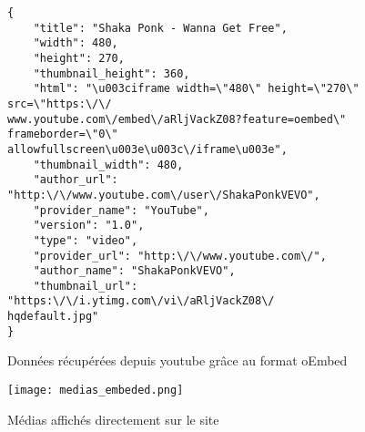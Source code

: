 \begin{figure}[H]
\begin{lstlisting}[frame=single]
{
    "title": "Shaka Ponk - Wanna Get Free", 
    "width": 480, 
    "height": 270, 
    "thumbnail_height": 360, 
    "html": "\u003ciframe width=\"480\" height=\"270\" src=\"https:\/\/
www.youtube.com\/embed\/aRljVackZ08?feature=oembed\" frameborder=\"0\" 
allowfullscreen\u003e\u003c\/iframe\u003e", 
    "thumbnail_width": 480, 
    "author_url": "http:\/\/www.youtube.com\/user\/ShakaPonkVEVO", 
    "provider_name": "YouTube", 
    "version": "1.0", 
    "type": "video", 
    "provider_url": "http:\/\/www.youtube.com\/", 
    "author_name": "ShakaPonkVEVO", 
    "thumbnail_url": "https:\/\/i.ytimg.com\/vi\/aRljVackZ08\/
hqdefault.jpg"
}
\end{lstlisting}
\caption{Données récupérées depuis youtube grâce au format oEmbed}
\end{figure}

\begin{figure}[H]
\begin{center}
\texttt{[image: medias\_embeded.png]}
\end{center}
\caption{Médias affichés directement sur le site}
\end{figure}